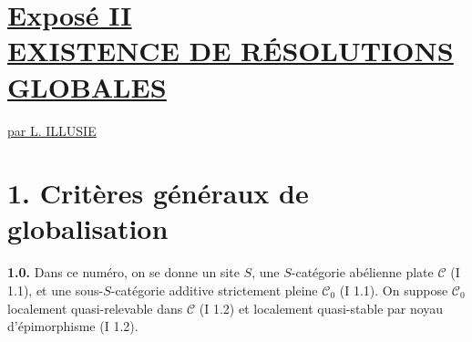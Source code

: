 \section*{\underline{Exposé II}\\[3pt] \underline{\underline{EXISTENCE DE RÉSOLUTIONS GLOBALES}}}
\begin{center}
\underline{par L. ILLUSIE}
\end{center}

\section*{1. Critères généraux de globalisation}

\textbf{1.0.} Dans ce numéro, on se donne un site $S$, une $S$-catégorie abélienne plate $\mathcal C$ (I 1.1), et une sous-$S$-catégorie additive strictement pleine $\mathcal C_0$ (I 1.1). On suppose $\mathcal C_0$ localement quasi-relevable dans $\mathcal C$ (I 1.2) et localement quasi-stable par noyau d'épimorphisme (I 1.2).


